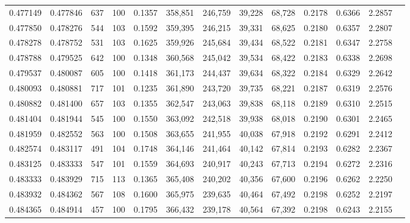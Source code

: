 \begin{tabular}{rrrrrrrrrrrrr}
0.477149 & 0.477846 &    637 &   100 &                                     0.1357 & 358,851 & 246,759 &  39,228 &  68,728 & 0.2178 & 0.6366 & 2.2857 \\
0.477850 & 0.478276 &    544 &   103 &                                     0.1592 & 359,395 & 246,215 &  39,331 &  68,625 & 0.2180 & 0.6357 & 2.2807 \\
0.478278 & 0.478752 &    531 &   103 &                                     0.1625 & 359,926 & 245,684 &  39,434 &  68,522 & 0.2181 & 0.6347 & 2.2758 \\
0.478788 & 0.479525 &    642 &   100 &                                     0.1348 & 360,568 & 245,042 &  39,534 &  68,422 & 0.2183 & 0.6338 & 2.2698 \\
0.479537 & 0.480087 &    605 &   100 &                                     0.1418 & 361,173 & 244,437 &  39,634 &  68,322 & 0.2184 & 0.6329 & 2.2642 \\
0.480093 & 0.480881 &    717 &   101 &                                     0.1235 & 361,890 & 243,720 &  39,735 &  68,221 & 0.2187 & 0.6319 & 2.2576 \\
0.480882 & 0.481400 &    657 &   103 &                                     0.1355 & 362,547 & 243,063 &  39,838 &  68,118 & 0.2189 & 0.6310 & 2.2515 \\
0.481404 & 0.481944 &    545 &   100 &                                     0.1550 & 363,092 & 242,518 &  39,938 &  68,018 & 0.2190 & 0.6301 & 2.2465 \\
0.481959 & 0.482552 &    563 &   100 &                                     0.1508 & 363,655 & 241,955 &  40,038 &  67,918 & 0.2192 & 0.6291 & 2.2412 \\
0.482574 & 0.483117 &    491 &   104 &                                     0.1748 & 364,146 & 241,464 &  40,142 &  67,814 & 0.2193 & 0.6282 & 2.2367 \\
0.483125 & 0.483333 &    547 &   101 &                                     0.1559 & 364,693 & 240,917 &  40,243 &  67,713 & 0.2194 & 0.6272 & 2.2316 \\
0.483333 & 0.483929 &    715 &   113 &                                     0.1365 & 365,408 & 240,202 &  40,356 &  67,600 & 0.2196 & 0.6262 & 2.2250 \\
0.483932 & 0.484362 &    567 &   108 &                                     0.1600 & 365,975 & 239,635 &  40,464 &  67,492 & 0.2198 & 0.6252 & 2.2197 \\
0.484365 & 0.484914 &    457 &   100 &                                     0.1795 & 366,432 & 239,178 &  40,564 &  67,392 & 0.2198 & 0.6243 & 2.2155 \\

\end{tabular}
